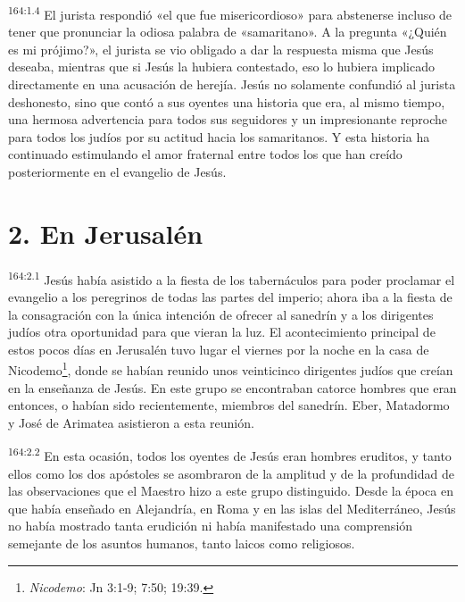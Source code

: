 \par
\textsuperscript{164:1.4} El jurista respondió «el que fue misericordioso» para abstenerse incluso de tener que pronunciar la odiosa palabra de «samaritano». A la pregunta «¿Quién es mi prójimo?», el jurista se vio obligado a dar la respuesta misma que Jesús deseaba, mientras que si Jesús la hubiera contestado, eso lo hubiera implicado directamente en una acusación de herejía. Jesús no solamente confundió al jurista deshonesto, sino que contó a sus oyentes una historia que era, al mismo tiempo, una hermosa advertencia para todos sus seguidores y un impresionante reproche para todos los judíos por su actitud hacia los samaritanos. Y esta historia ha continuado estimulando el amor fraternal entre todos los que han creído posteriormente en el evangelio de Jesús.

\section*{2. En Jerusalén}
\par
\textsuperscript{164:2.1} Jesús había asistido a la fiesta de los tabernáculos para poder proclamar el evangelio a los peregrinos de todas las partes del imperio; ahora iba a la fiesta de la consagración con la única intención de ofrecer al sanedrín y a los dirigentes judíos otra oportunidad para que vieran la luz. El acontecimiento principal de estos pocos días en Jerusalén tuvo lugar el viernes por la noche en la casa de Nicodemo\footnote{\textit{Nicodemo}: Jn 3:1-9; 7:50; 19:39.}, donde se habían reunido unos veinticinco dirigentes judíos que creían en la enseñanza de Jesús. En este grupo se encontraban catorce hombres que eran entonces, o habían sido recientemente, miembros del sanedrín. Eber, Matadormo y José de Arimatea asistieron a esta reunión.

\par
\textsuperscript{164:2.2} En esta ocasión, todos los oyentes de Jesús eran hombres eruditos, y tanto ellos como los dos apóstoles se asombraron de la amplitud y de la profundidad de las observaciones que el Maestro hizo a este grupo distinguido. Desde la época en que había enseñado en Alejandría, en Roma y en las islas del Mediterráneo, Jesús no había mostrado tanta erudición ni había manifestado una comprensión semejante de los asuntos humanos, tanto laicos como religiosos.

